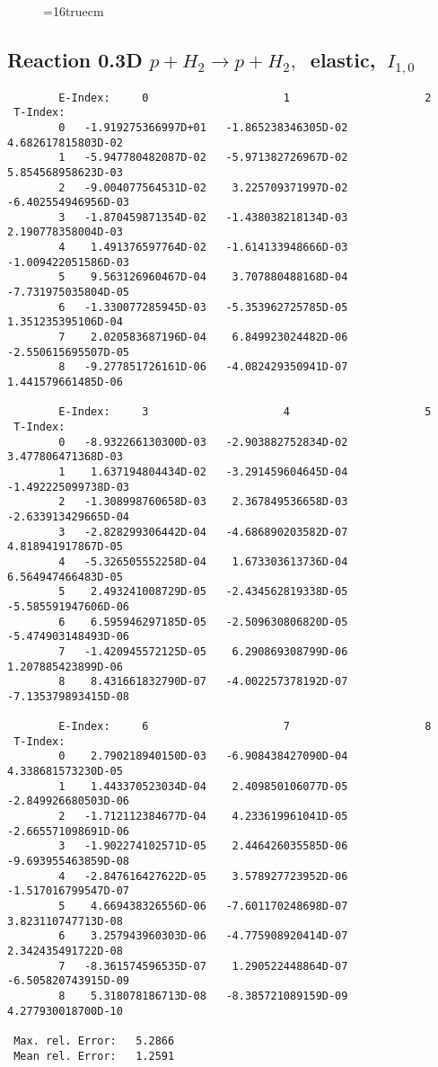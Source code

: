\documentclass[12pt,dvipdfmx]{article}
\begin{document}
\begin{figure} \label{0.3T}
\epsfxsize=16truecm
\end{figure}
\newpage


\subsection{
Reaction 0.3D  $p + H_2 \rightarrow  p + H_2 ,\ $  elastic,
$\  I_{1,0}$
}

\begin{small}\begin{verbatim}
        E-Index:     0                     1                     2
 T-Index:
        0   -1.919275366997D+01   -1.865238346305D-02    4.682617815803D-02
        1   -5.947780482087D-02   -5.971382726967D-02    5.854568958623D-03
        2   -9.004077564531D-02    3.225709371997D-02   -6.402554946956D-03
        3   -1.870459871354D-02   -1.438038218134D-03    2.190778358004D-03
        4    1.491376597764D-02   -1.614133948666D-03   -1.009422051586D-03
        5    9.563126960467D-04    3.707880488168D-04   -7.731975035804D-05
        6   -1.330077285945D-03   -5.353962725785D-05    1.351235395106D-04
        7    2.020583687196D-04    6.849923024482D-06   -2.550615695507D-05
        8   -9.277851726161D-06   -4.082429350941D-07    1.441579661485D-06

        E-Index:     3                     4                     5
 T-Index:
        0   -8.932266130300D-03   -2.903882752834D-02    3.477806471368D-03
        1    1.637194804434D-02   -3.291459604645D-04   -1.492225099738D-03
        2   -1.308998760658D-03    2.367849536658D-03   -2.633913429665D-04
        3   -2.828299306442D-04   -4.686890203582D-07    4.818941917867D-05
        4   -5.326505552258D-04    1.673303613736D-04    6.564947466483D-05
        5    2.493241008729D-05   -2.434562819338D-05   -5.585591947606D-06
        6    6.595946297185D-05   -2.509630806820D-05   -5.474903148493D-06
        7   -1.420945572125D-05    6.290869308799D-06    1.207885423899D-06
        8    8.431661832790D-07   -4.002257378192D-07   -7.135379893415D-08

        E-Index:     6                     7                     8
 T-Index:
        0    2.790218940150D-03   -6.908438427090D-04    4.338681573230D-05
        1    1.443370523034D-04    2.409850106077D-05   -2.849926680503D-06
        2   -1.712112384677D-04    4.233619961041D-05   -2.665571098691D-06
        3   -1.902274102571D-05    2.446426035585D-06   -9.693955463859D-08
        4   -2.847616427622D-05    3.578927723952D-06   -1.517016799547D-07
        5    4.669438326556D-06   -7.601170248698D-07    3.823110747713D-08
        6    3.257943960303D-06   -4.775908920414D-07    2.342435491722D-08
        7   -8.361574596535D-07    1.290522448864D-07   -6.505820743915D-09
        8    5.318078186713D-08   -8.385721089159D-09    4.277930018700D-10

 Max. rel. Error:   5.2866
 Mean rel. Error:   1.2591
\end{verbatim}\end{small}
\end{document}
